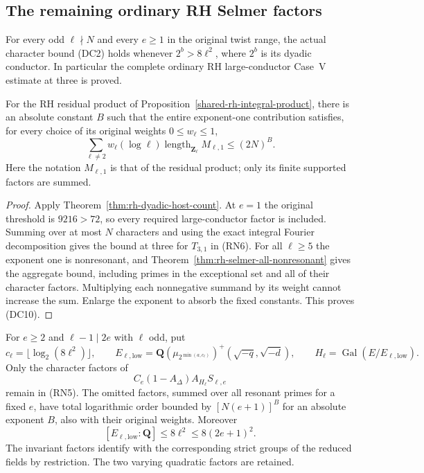 \subsection{The remaining ordinary RH Selmer factors}
\label{sec:rh-selmer-low-dyadic}

\begin{corollary}
\label{cor:rh-selmer-exponent-one}
For every odd $\ell\nmid N$ and every $e\ge1$ in the original
twist range, the actual character bound (DC2) holds whenever
$2^b>8\ell^2$, where $2^b$ is its dyadic conductor.
In particular the complete ordinary RH large-conductor
Case~V estimate at three is proved.

For the RH residual product of
Proposition~\ref{shared-rh-integral-product}, there is an
absolute constant $B$ such that the entire exponent-one
contribution satisfies, for every choice of its original
weights $0\le w_\ell\le1$,
\[
       \sum_{\ell\ne2}w_\ell(\log\ell)
                       \operatorname{length}_{\mathbf Z_\ell} M_{\ell,1}
                         \le (2N)^B .                          \tag{DC10}
\]
Here the notation $M_{\ell,1}$ is that of the residual product;
only its finite supported factors are summed.
\end{corollary}

\begin{proof}
Apply Theorem~\ref{thm:rh-dyadic-host-count}.
At $e=1$ the original threshold is $9216>72$, so every
required large-conductor factor is included. Summing over at
most $N$ characters and using the exact integral Fourier
decomposition gives the bound at three for $T_{3,1}$ in (RN6).
For all $\ell\ge5$ the exponent one is nonresonant, and
Theorem~\ref{thm:rh-selmer-all-nonresonant} gives the aggregate
bound, including primes in the exceptional set and all of
their character factors. Multiplying each nonnegative summand
by its weight cannot increase the sum. Enlarge the exponent
to absorb the fixed constants. This proves (DC10).
\end{proof}

\begin{corollary}
\label{cor:rh-selmer-low-dyadic}
For $e\ge2$ and $\ell-1\mid2e$ with $\ell$ odd, put
\[
 c_\ell=\lfloor\log_2(8\ell^2)\rfloor,\qquad
 E_{\ell,\mathrm{low}}=
 \mathbf Q(\mu_{2^{\min(a,c_\ell)}})^+
          (\sqrt{-q},\sqrt{-d}),\qquad
 H_\ell=\operatorname{Gal}(E/E_{\ell,\mathrm{low}}).
\]
Only the character factors of
\[
 C_e(1-A_\Delta)A_{H_\ell}S_{\ell,e}                 \tag{DC11}
\]
remain in (RN5). The omitted factors, summed over all
resonant primes for a fixed $e$, have total logarithmic
order bounded by $[N(e+1)]^B$ for an absolute exponent $B$,
also with their original weights.
Moreover
\[
 [E_{\ell,\mathrm{low}}:\mathbf Q]\le8\ell^2
                             \le8(2e+1)^2 .
\]
The invariant factors identify with the corresponding
strict groups of the reduced fields by restriction.
The two varying quadratic factors are retained.
\end{corollary}

